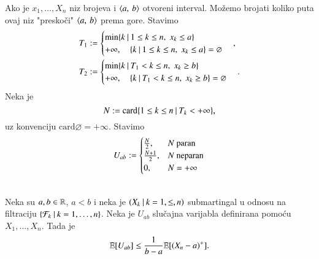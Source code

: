 Ako je $x_1, \ldots, X_n$ niz brojeva i $\langle {a}, \: {b} \rangle$ otvoreni interval.
Mo\v zemo brojati koliko puta ovaj niz "presko\v ci" $\langle {a}, \: {b} \rangle$ prema gore.
Stavimo
\begin{equation*}
    \begin{aligned}
        T_1 &:=
        \begin{cases}
            \min \{{k} \: | \: {1 \leq k \leq n, \; x_k \leq a}\}\\
            +\infty, \quad \{{k} \: | \: {1 \leq k \leq n, \; x_k \leq a}\} = \varnothing
        \end{cases},\\
        T_2 &:=
        \begin{cases}
            \min \{{k} \: | \: {T_1 < k \leq n, \; x_k \geq b}\}\\
            +\infty, \quad \{{k} \: | \: {T_1 < k \leq n, \; x_k \geq b}\} = \varnothing
        \end{cases}.
    \end{aligned}
\end{equation*}
Neka je
\begin{equation*}
    N := \mathrm{card} \{{1 \leq k \leq n} \: | \: {T_k < +\infty}\},
\end{equation*}
uz konvenciju $\mathrm{card} \varnothing = +\infty$.
Stavimo
\begin{equation*}
    U_{a b} :=
    \begin{cases}
        \frac{N}{2},& N \textnormal{ paran}\\
        \frac{N + 1}{2},& N \textnormal{ neparan}\\
        0,& N = +\infty
    \end{cases}
\end{equation*}

\begin{tm}    \label{tm:24.2}
    \quad \\
    Neka su $a, b \in \mathbb{R}$, $a < b$ i neka je $({X_k} \: | \: {k = 1, \leq, n})$ submartingal u odnosu na filtraciju $\{{\mathcal{F}_k} \: | \: {k = 1, \ldots, n}\}$.
    Neka je $U_{a b}$ slu\v cajna varijabla definirana pomo\' cu $X_1, \ldots, X_n$.
    Tada je
    \begin{equation*}
        \mathbb{E} [U_{a b}] \leq \frac{1}{b - a} \mathbb{E} [(X_n - a)^+].
    \end{equation*}
\end{tm}

